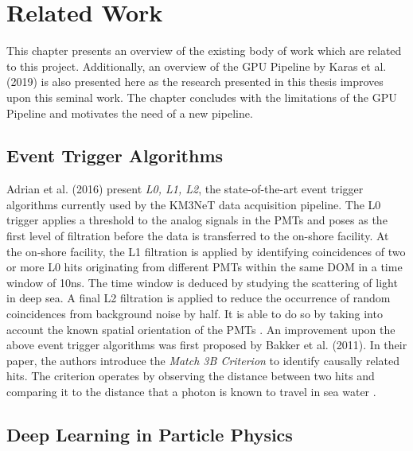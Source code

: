 \chapter{Related Work}
\label{cha:related-work}

This chapter presents an overview of the existing body of work which
are related to this project. Additionally, an overview of the GPU
Pipeline by Karas et al. (2019) is also presented here as the research
presented in this thesis improves upon this seminal work. The chapter
concludes with the limitations of the GPU Pipeline and motivates the
need of a new pipeline.

\section{Event Trigger Algorithms}
\label{sec:trigger-algos}

Adrian et al. (2016) present \emph{L0, L1, L2}, the state-of-the-art
event trigger algorithms currently used by the KM3NeT data acquisition
pipeline. The L0 trigger applies a threshold to the analog signals in
the PMTs and poses as the first level of filtration before the data is
transferred to the on-shore facility. At the on-shore facility, the L1
filtration is applied by identifying coincidences of two or more L0
hits originating from different PMTs within the same DOM in a time
window of 10ns. The time window is deduced by studying the scattering
of light in deep sea. A final L2 filtration is applied to reduce the
occurrence of random coincidences from background noise by half. It is
able to do so by taking into account the known spatial orientation of
the PMTs \cite{adrian2016letter}. An improvement upon the above event
trigger algorithms was first proposed by Bakker et al. (2011). In
their paper, the authors introduce the \emph{Match 3B Criterion} to
identify causally related hits. The criterion operates by observing
the distance between two hits and comparing it to the distance that a
photon is known to travel in sea water \cite{bakker2011trigger}.

\section{Deep Learning in Particle Physics}
\label{sec:dl-part-phy}


